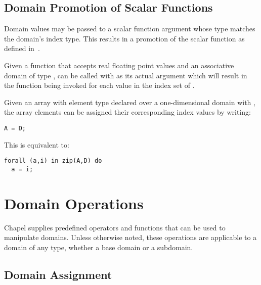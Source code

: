 \subsection{Domain Promotion of Scalar Functions}
\label{Domain_Promotion_of_Scalar_Functions}

Domain values may be passed to a scalar function argument whose type
matches the domain's index type.  This results in a promotion of the
scalar function as defined in~.

\begin{example}
Given a function  that accepts real floating point values
and an associative domain  of
type ,  can be called with  as
its actual argument which will result in the function being invoked
for each value in the index set of .
\end{example}

\begin{example}
Given an array  with element type  declared over a
one-dimensional domain  with  , the
array elements can be assigned their corresponding index values by
writing:
\begin{chapel}
\begin{verbatim}
A = D;
\end{verbatim}
\end{chapel}
This is equivalent to:
\begin{chapel}
\begin{verbatim}
forall (a,i) in zip(A,D) do
  a = i;
\end{verbatim}
\end{chapel}
\end{example}


\section{Domain Operations}

Chapel supplies predefined operators and functions that can be used to manipulate
domains.  Unless otherwise noted, these operations are applicable to a domain of
any type, whether a base domain or a subdomain.

\subsection{Domain Assignment}
\label{Domain_Assignment}

